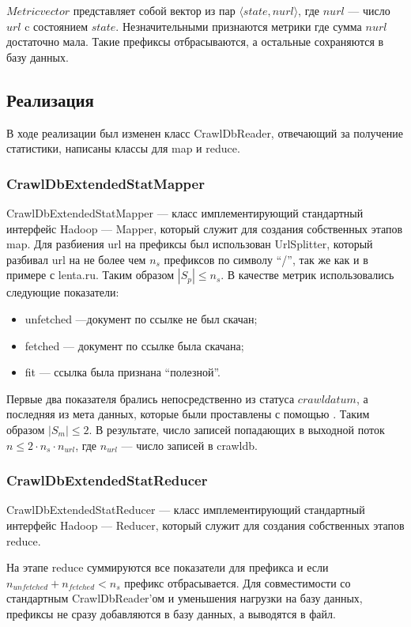 $Metricvector$ представляет собой вектор из пар $\langle state, nurl \rangle$, где $nurl$ --- число $url$ c состоянием $state$.
Незначительными признаются метрики где сумма $nurl$ достаточно мала. Такие префиксы отбрасываются, а остальные сохраняются в базу данных.

\subsection{Реализация}
В ходе реализации был изменен класс CrawlDbReader, отвечающий за получение статистики, написаны классы для map и reduce.

\subsubsection{CrawlDbExtendedStatMapper}
CrawlDbExtendedStatMapper --- класс имплементирующий стандартный интерфейс Hadoop --- Mapper, который служит для создания собственных этапов map.
Для разбиения url на префиксы был использован UrlSplitter, который разбивал url на не более чем $n_{s}$ префиксов по символу ``/'', так же как и в примере с lenta.ru. Таким образом $|S_{p}|\leqslant n_{s}$.
В качестве метрик использовались следующие показатели:
\begin{itemize}
 \item unfetched ---документ по ссылке не был скачан;
 \item fetched --- документ по ссылке была скачана;
 \item fit --- ссылка была признана ``полезной''.
\end{itemize}
Первые два показателя брались непосредственно из статуса $crawldatum$, а последняя из мета данных, которые были проставлены с помощью . Таким образом $|S_{m}|\leqslant2$. В результате, число записей попадающих в выходной поток $n\leqslant 2\cdot n_{s}\cdot n_{url}$, где $n_{url}$ --- число записей в crawldb.

\subsubsection{CrawlDbExtendedStatReducer}
CrawlDbExtendedStatReducer --- класс имплементирующий стандартный интерфейс Hadoop --- Reducer, который служит для создания собственных этапов reduce.

На этапе reduce суммируются все показатели для префикса и если $n_{unfetched}+n_{fetched} < n_{s}$ префикс отбрасывается. Для совместимости со стандартным CrawlDbReader'ом и уменьшения нагрузки на базу данных, префиксы не сразу добавляются в базу данных, а выводятся в файл. 
